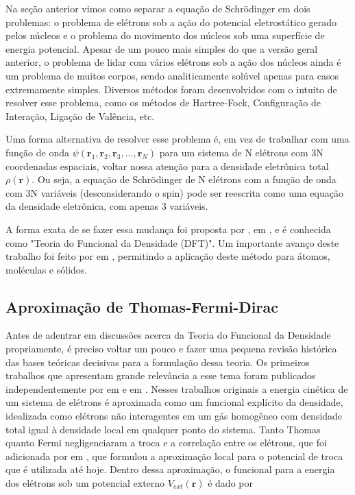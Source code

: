 	Na seção anterior vimos como separar a equação de Schrödinger em dois problemas: o problema de elétrons sob a ação do potencial eletrostático gerado pelos núcleos e o problema do movimento dos núcleos sob uma superfície de energia potencial. Apesar de um pouco mais simples do que a versão geral anterior, o problema de lidar com vários elétrons sob a ação dos núcleos ainda é um problema de muitos corpos, sendo analiticamente solúvel apenas para casos extremamente simples. Diversos métodos foram desenvolvidos com o intuito de resolver esse problema, como os métodos de Hartree-Fock, Configuração de Interação, Ligação de Valência, etc. 
	
	Uma forma alternativa de resolver esse problema é, em vez de trabalhar com uma função de onda $\psi(\textbf{r}_1, \textbf{r}_2, \textbf{r}_3, ..., \textbf{r}_N)$ para um sistema de N elétrons com 3N coordenadas espaciais, voltar nossa atenção para a densidade eletrônica total $\rho(\textbf{r})$. Ou seja, a equação de Schrödinger de N elétrons com a função de onda com 3N variáveis (desconsiderando o spin) pode ser reescrita como uma equação da densidade eletrônica, com apenas 3 variáveis. 
	
	A forma exata de se fazer essa mudança foi proposta por , em \citeyear{hohenberg1964inhomogeneous} \cite{hohenberg1964inhomogeneous}, e é conhecida como "Teoria do Funcional da Densidade (DFT)". Um importante avanço deste trabalho foi feito por  em \citeyear{kohn1965self} \cite{kohn1965self}, permitindo a aplicação deste método para átomos, moléculas e sólidos. 

	
	\subsection{Aproximação de Thomas-Fermi-Dirac}
	
			Antes de adentrar em discussões acerca da Teoria do Funcional da Densidade propriamente, é preciso voltar um pouco e fazer uma pequena revisão histórica das bases teóricas decisivas para a formulação dessa teoria. Os primeiros trabalhos que apresentam grande relevância a esse tema foram publicados independentemente por  em \citeyear{thomas1927calculation} \cite{thomas1927calculation} e   em \citeyear{fermi1928statistische} \cite{fermi1928statistische}. Nesses trabalhos originais a energia cinética de um sistema de elétrons é aproximada como um funcional explícito da densidade, idealizada como elétrons não interagentes em um gás homogêneo com densidade total igual à densidade local em qualquer ponto do sistema. Tanto Thomas quanto Fermi negligenciaram a troca e a correlação entre os elétrons, que foi adicionada por  em \citeyear{dirac1930note} \cite{dirac1930note}, que formulou a aproximação local para o potencial de troca que é utilizada até hoje. Dentro dessa aproximação, o funcional para a energia dos elétrons sob um potencial externo $V_{ext}(\textbf{r})$ é dado por
			
